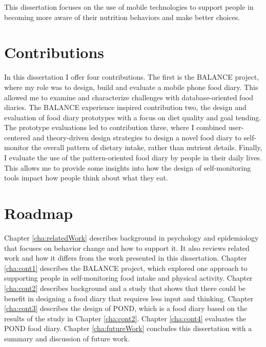 This dissertation focuses on the use of mobile technologies to support people in becoming more aware of their nutrition behaviors and make better choices. 

\section{Contributions}
In this dissertation I offer four contributions. The first is the BALANCE project, where my role was to design, build and evaluate a mobile phone food diary. This allowed me to examine and characterize challenges with database-oriented food diaries. The BALANCE experience inspired contribution two, the design and evaluation of food diary prototypes with a focus on diet quality and goal tending. The prototype evaluations led to contribution three, where I combined user-centered and theory-driven design strategies to design a novel food diary to self-monitor the overall pattern of dietary intake, rather than nutrient details. Finally, I evaluate the use of the pattern-oriented food diary by people in their daily lives. This allows me to provide some insights into how the design of self-monitoring tools impact how people think about what they eat. 

\section{Roadmap}
Chapter \ref{cha:relatedWork} describes background in psychology and epidemiology that focuses on behavior change and how to support it. It also reviews related work and how it differs from the work presented in this dissertation.  Chapter \ref{cha:cont1} describes the BALANCE project, which explored one approach to supporting people in self-monitoring food intake and physical activity. Chapter \ref{cha:cont2} describes background and a study that shows that there could be benefit in designing a food diary that requires less input and thinking. Chapter \ref{cha:cont3} describes the design of POND, which is a food diary based on the results of the study in Chapter \ref{cha:cont2}. Chapter \ref{cha:cont4} evaluates the POND food diary. Chapter \ref{cha:futureWork} concludes this dissertation with a summary and discussion of future work. 
